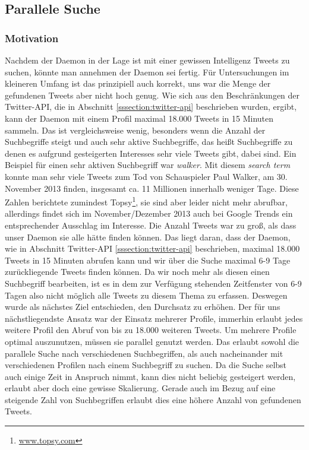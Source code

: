 \subsection{Parallele Suche} %
\label{ssection:parallele-suche}
\subsubsection{Motivation}
Nachdem der Daemon in der Lage ist mit einer gewissen Intelligenz Tweets zu suchen, könnte man annehmen der Daemon sei fertig.
Für Untersuchungen im kleineren Umfang ist das prinzipiell auch korrekt, uns war die Menge der gefundenen Tweets aber nicht hoch genug.
Wie sich aus den Beschränkungen der Twitter-API, die in Abschnitt \ref{sssection:twitter-api} beschrieben wurden, ergibt, kann der Daemon mit einem Profil maximal 18.000 Tweets in 15 Minuten sammeln.
Das ist vergleichsweise wenig, besonders wenn die Anzahl der Suchbegriffe steigt und auch sehr aktive Suchbegriffe, das heißt Suchbegriffe zu denen es aufgrund gesteigerten Interesses sehr viele Tweets gibt, dabei sind.
Ein Beispiel für einen sehr aktiven Suchbegriff war \textit{walker}.
Mit diesem \textit{search term} konnte man sehr viele Tweets zum Tod von Schauspieler Paul Walker, am 30. November 2013 finden, insgesamt ca. 11 Millionen innerhalb weniger Tage.
Diese Zahlen berichtete zumindest Topsy\footnote{\url{www.topsy.com}}, sie sind aber leider nicht mehr abrufbar, allerdings findet sich im November/Dezember 2013 auch bei Google Trends \cite{GoogleTrendsWalker14} ein entsprechender Ausschlag im Interesse.
Die Anzahl Tweets war zu groß, als dass unser Daemon sie alle hätte finden können.
Das liegt daran, dass der Daemon, wie in Abschnitt Twitter-API \ref{sssection:twitter-api} beschrieben, maximal 18.000 Tweets in 15 Minuten abrufen kann und wir über die Suche maximal 6-9 Tage zurückliegende Tweets finden können.
Da wir noch mehr als diesen einen Suchbegriff bearbeiten, ist es in dem zur Verfügung stehenden Zeitfenster von 6-9 Tagen also nicht möglich alle Tweets zu diesem Thema zu erfassen.
Deswegen wurde als nächstes Ziel entschieden, den Durchsatz zu erhöhen.
Der für uns nächstliegendste Ansatz war der Einsatz mehrerer Profile, immerhin erlaubt jedes weitere Profil den Abruf von bis zu 18.000 weiteren Tweets.
Um mehrere Profile optimal auszunutzen, müssen sie  parallel genutzt werden.
Das erlaubt sowohl die parallele Suche nach verschiedenen Suchbegriffen, als auch nacheinander mit verschiedenen Profilen nach einem Suchbegriff zu suchen.
Da die Suche selbst auch einige Zeit in Anspruch nimmt, kann dies nicht beliebig gesteigert werden, erlaubt aber doch eine gewisse Skalierung.
Gerade auch im Bezug auf eine steigende Zahl von Suchbegriffen erlaubt dies eine höhere Anzahl von gefundenen Tweets.

